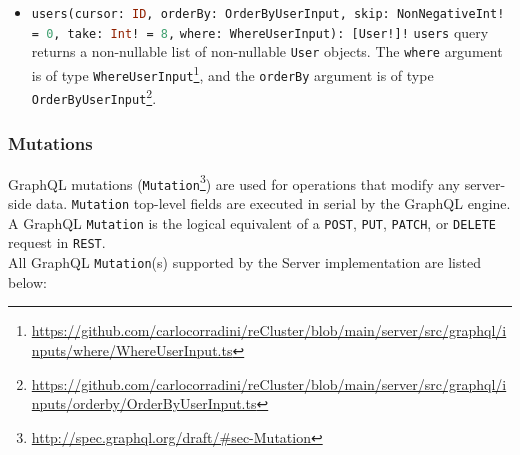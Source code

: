 \begin{itemize}
  \item \lstinline[language=graphql, morekeywords={[2]{User, OrderByUserInput, NonNegativeInt, WhereUserInput}},
    morekeywords={[4]{cursor, orderBy, skip, take, where}}, morekeywords={[5]{users}}]{users(cursor: ID, orderBy: OrderByUserInput, skip: NonNegativeInt! = 0, take: Int! = 8,}
    \newline
    \hphantom{-----------}\lstinline[language=graphql, morekeywords={[2]{User, OrderByUserInput, NonNegativeInt, WhereUserInput}},
    morekeywords={[4]{cursor, orderBy, skip, take, where}}, morekeywords={[5]{users}}]{where: WhereUserInput): [User!]!}
    \newline
    \texttt{users} query returns a non-nullable list of non-nullable \texttt{User}
    objects.
    \newline
    The \texttt{where} argument is of type \texttt{WhereUserInput}\footnote{\url{https://github.com/carlocorradini/reCluster/blob/main/server/src/graphql/inputs/where/WhereUserInput.ts}},
    and the \texttt{orderBy} argument is of type \texttt{OrderByUserInput}\footnote{\url{https://github.com/carlocorradini/reCluster/blob/main/server/src/graphql/inputs/orderby/OrderByUserInput.ts}}.
\end{itemize}

\subsubsection{Mutations}
\label{subsubsec:implementation_server_graphql_api_mutations}

GraphQL mutations (\texttt{Mutation}\footnote{\url{http://spec.graphql.org/draft/\#sec-Mutation}})
are used for operations that modify any server-side data. \texttt{Mutation} top-level
fields are executed in serial by the GraphQL engine. \\ %
A GraphQL \texttt{Mutation} is the logical equivalent of a \texttt{POST}, \texttt{PUT},
\texttt{PATCH}, or \texttt{DELETE} request in \texttt{REST}. \\ %
All GraphQL \texttt{Mutation}(s) supported by the Server implementation are listed
below:

